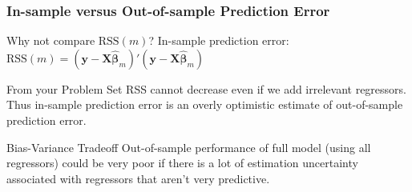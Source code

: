 \begin{frame}
  \frametitle{In-sample versus Out-of-sample Prediction Error}

  \begin{block}{Why not compare $\mbox{RSS}(m)$?}
    In-sample prediction error: $\text{RSS}(m) = (\mathbf{y} - \mathbf{X}\widehat{\boldsymbol{\beta}}_m)' (\mathbf{y} - \mathbf{X}\widehat{\boldsymbol{\beta}}_m)$
  \end{block}

  \pause

  \begin{block}{From your Problem Set}
    RSS cannot decrease even if we add irrelevant regressors. 
    Thus in-sample prediction error is an \alert{overly optimistic} estimate of out-of-sample prediction error.
  \end{block}

  \pause

  \begin{block}{Bias-Variance Tradeoff}
   Out-of-sample performance of full model (using all regressors) could be very poor if there is a lot of estimation uncertainty associated with regressors that aren't very predictive. 
  \end{block}
\end{frame}
